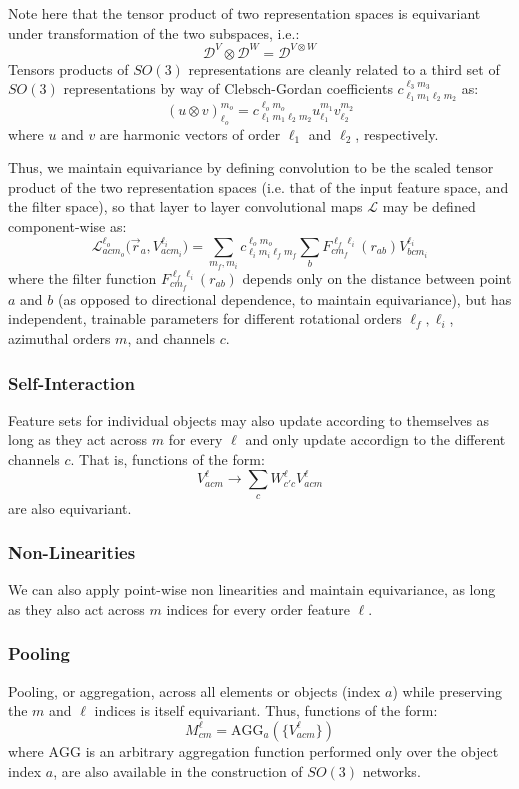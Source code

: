 \documentclass[10pt,a4paper]{article}
\begin{document}
Note here that the tensor product of two representation spaces is equivariant under transformation of the two subspaces, i.e.:
$$
\mathcal{D}^V\otimes \mathcal{D}^W=\mathcal{D}^{V\otimes W}
$$
Tensors products of $SO(3)$ representations are cleanly related to a third set of $SO(3)$ representations by way of Clebsch-Gordan coefficients $c^{\ell_3m_3}_{\ell_1m_1\ell_2m_2}$ as:
$$
(u\otimes v)_{\ell_o}^{m_o} = c_{\ell_1m_1\ell_2m_2}^{\ell_om_o}u_{\ell_1}^{m_1}v_{\ell_2}^{m_2}
$$
where $u$ and $v$ are harmonic vectors of order $\ell_1$ and $\ell_2$, respectively.

Thus, we maintain equivariance by defining convolution to be the scaled tensor product of the two representation spaces (i.e. that of the input feature space, and the filter space), so that layer to layer convolutional maps $\mathcal{L}$ may be defined component-wise as:
$$
\mathcal{L}^{\ell_o}_{acm_o}\big(\vec{r}_a,V_{acm_i}^{\ell_i}\big) = \sum_{m_f,m_i}c_{\ell_im_i\ell_fm_f}^{\ell_o m_o}\sum_{b}F^{\ell_f\ell_i}_{cm_f}(r_{ab})V_{bcm_i}^{\ell_i}
$$
where the filter function $F^{\ell_f\ell_i}_{cm_f}(r_{ab})$ depends only on the distance between point $a$ and $b$ (as opposed to directional dependence, to maintain equivariance), but has independent, trainable parameters for different rotational orders $\ell_f, \ell_i$, azimuthal orders $m$, and channels $c$.

\subsubsection{Self-Interaction}
Feature sets for individual objects may also update according to themselves as long as they act across $m$ for every $\ell$ and only update accordign to the different channels $c$. That is, functions of the form:
$$
V_{acm}^{\ell} \rightarrow  \sum _{c}W^{\ell}_{c'c}V_{acm}^{\ell}
$$
are also equivariant. 

\subsubsection{Non-Linearities}
We can also apply point-wise non linearities and maintain equivariance, as long as they also act across $m$ indices for every order feature $\ell$.

\subsubsection{Pooling}
Pooling, or aggregation, across all elements or objects (index $a$) while preserving the $m$ and $\ell$ indices is itself equivariant. Thus, functions of the form:
$$
 M_{cm}^{\ell} = \text{AGG}_{a}(\lbrace V_{acm}^{\ell}\rbrace)
$$ 
where $\text{AGG}$ is an arbitrary aggregation function performed only over the object index $a$, are also available in the construction of $SO(3)$ networks.
\end{document}
